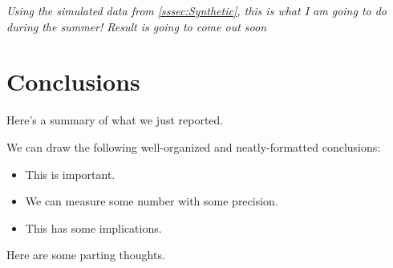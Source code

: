 \documentclass[\docopts]{\docclass}
\begin{document}
\textit{Using the simulated data from \ref{sssec:Synthetic}, this is what I am going to do during the summer! Result is going to come out soon }


\section{Conclusions}
\label{sec:conclusions}

Here's a summary of what we just reported.

We can draw the following well-organized and neatly-formatted conclusions:
\begin{itemize}
  \item This is important.
  \item We can measure some number with some precision.
  \item This has some implications.
\end{itemize}

Here are some parting thoughts.
\end{document}
